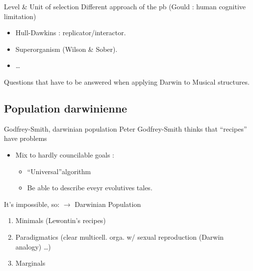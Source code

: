 \documentclass[8pt]{beamer}
\begin{document}
\begin{frame}{Level \& Unit of selection}
	Different approach of the pb (Gould : human cognitive limitation) 
	\vfill
	\begin{itemize}
		\item Hull-Dawkins : replicator/interactor. 
		\item Superorganism (Wilson \& Sober).
		\item \ldots
	\end{itemize}


	Questions that have to be answered when applying Darwin to Musical structures.

\end{frame}

\subsection{Population darwinienne}
\begin{frame}{Godfrey-Smith, darwinian population}
	Peter Godfrey-Smith thinks that ``recipes'' have problems
	\vfil
	\begin{itemize}
		\item Mix to hardly councilable goals : 
			\begin{itemize}
				\item  ``Universal''algorithm
				\item Be able to describe eveyr evolutives tales.
			\end{itemize}
	\end{itemize}
	\vfill
	It's impossible, so:
	$\rightarrow$  Darwinian Population 
	\begin{enumerate}
		\item Minimals (Lewontin's recipes)
		\item Paradigmatics (clear multicell. orga.  w/ sexual reproduction (Darwin analogy)  \ldots )
		\item Marginals
	\end{enumerate}
	
\end{frame}
\end{document}
